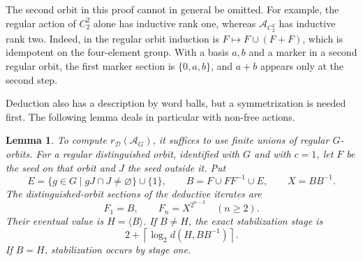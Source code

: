 \documentclass[12pt,english]{amsart}
\newtheorem{lemma}[theorem]{Lemma}
\theoremstyle{definition}
\numberwithin{equation}{section}
\theoremstyle{remark}
\begin{document}
The second orbit in this proof cannot in general be omitted.
For example, the regular action of $C_2^2$ alone has inductive
rank one, whereas $\mathcal A_{C_2^2}$ has inductive rank two.
Indeed, in the regular orbit induction is $F\mapsto F\cup(F+F)$,
which is idempotent on the four-element group. With a basis $a,b$
and a marker in a second regular orbit, the first marker section is
$\{0,a,b\}$, and $a+b$ appears only at the second step.

Deduction also has a description by word balls, but a symmetrization
is needed first. The following lemma deals in particular with
non-free actions.

\begin{lemma}\label{LemGroupDeductionBalls}
To compute $r_{\mathcal D}(\mathcal A_G)$, it suffices to use finite
unions of regular $G$-orbits. For a regular distinguished orbit,
identified with $G$ and with $c=1$, let $F$ be the seed on that
orbit and $J$ the seed outside it. Put
\[
E=\{g\in G\mid gJ\cap J\ne\varnothing\}\cup\{1\},\qquad
B=F\cup FF^{-1}\cup E,\qquad X=BB^{-1}.
\]
The distinguished-orbit sections of the deductive iterates are
\begin{equation}\label{EqGroupDeductionBalls}
F_1=B,\qquad F_n=X^{2^{n-2}}\quad(n\geqslant2).
\end{equation}
Their eventual value is $H=\langle B\rangle$. If $B\ne H$,
the exact stabilization stage is
\begin{equation}\label{EqGroupDeductionTime}
2+\left\lceil\log_2 d(H,BB^{-1})\right\rceil.
\end{equation}
If $B=H$, stabilization occurs by stage one.
\end{lemma}
\end{document}

